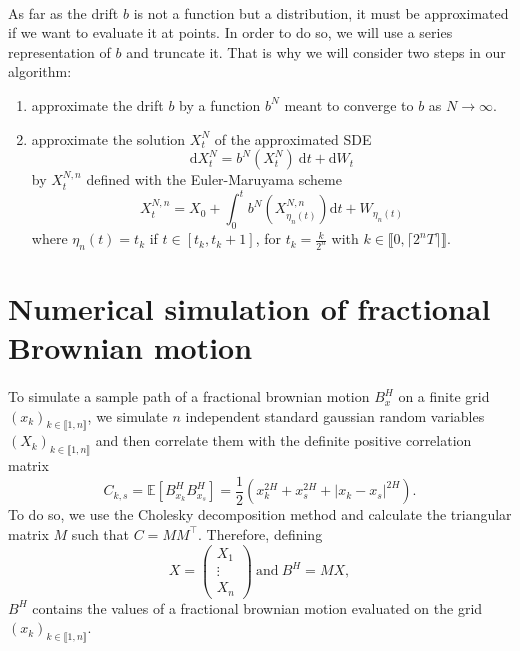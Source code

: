 \documentclass{article}[12pt]
\newcommand{\E}{\mathbb{E}}
\newcommand{\di}{\mathrm{d}}
\begin{document}
    \paragraph{}
    As far as the drift $b$ is not a function but a distribution, it must be approximated if we want to evaluate it at points. In order to do so, we will use a series representation of $b$ and truncate it. That is why we will consider two steps in our algorithm: \begin{enumerate}
        \item approximate the drift $b$ by a function $b^N$ meant to converge to $b$ as $N\rightarrow\infty$.
        \item approximate the solution $X^N_t$ of the approximated SDE
        \begin{equation} \label{sde2}
        \di X^N_t = b^N\left(X^N_t\right)\ \di t + \di W_t
        \end{equation} 
        by $X^{N,n}_t$ defined with the Euler-Maruyama scheme
        \begin{equation*}
        X^{N,n}_t = X_0 + \int_0^t b^N\left(X^{N,n}_{\eta_n(t)}\right)\di t + W_{\eta_n(t)}
        \end{equation*}
        where $\eta_n(t)=t_k$ if $t\in[t_k,t_k+1]$, for $t_k=\frac{k}{2^n}$ with $ k\in\llbracket0,\lceil2^nT\rceil\rrbracket$.
        
    \end{enumerate}

\section{Numerical simulation of fractional Brownian motion}    
    \paragraph{}
    To simulate a sample path of a fractional brownian motion $B^H_x$ on a finite grid $(x_k)_{k\in\llbracket1,n\rrbracket}$, we simulate $n$ independent standard gaussian random variables $(X_k)_{k\in\llbracket1,n\rrbracket}$ and then correlate them with the definite positive correlation matrix 
    $$C_{k,s}=\E\left[B_{x_k}^HB_{x_s}^H\right]=\frac{1}{2}\left(x_k^{2H}+x_s^{2H}+|x_k-x_s|^{2H}\right).$$
    To do so, we use the Cholesky decomposition method and calculate the triangular matrix $M$ such that $C=MM^\top$. Therefore, defining
    $$X = \begin{pmatrix}
    X_1 \\ \vdots \\ X_n
    \end{pmatrix}\ \mathrm{and}\ B^H = MX,$$
    $B^H$ contains the values of a fractional brownian motion evaluated on the grid $(x_k)_{k\in\llbracket1,n\rrbracket}$.
    
\end{document}
